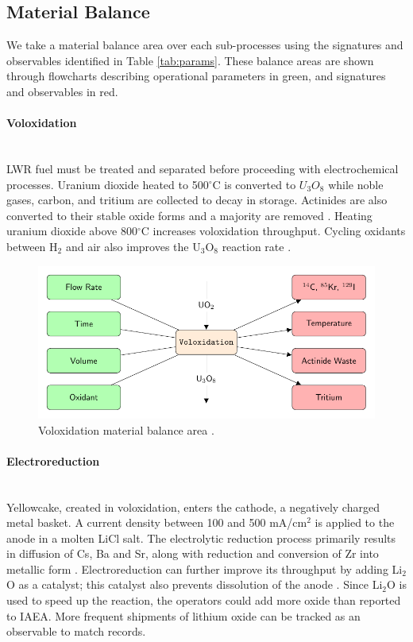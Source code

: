 \subsection{Material Balance}
We take a material balance area over each sub-processes using the signatures and observables identified in Table \ref{tab:params}. 
These balance areas are shown through flowcharts describing operational parameters in green, and signatures and observables in red. 

\paragraph{Voloxidation} \mbox{}\\
\gls{LWR} fuel must be treated and separated before proceeding with electrochemical processes. Uranium dioxide heated to 
500$^{\circ}$C is converted to $U_3O_8$ while noble gases, carbon, and tritium are collected to decay in storage. 
Actinides are also converted to their stable oxide forms and a majority are removed \cite{flowsheet_1998,jubin_spent_2009}. 
Heating uranium dioxide above 800$^{\circ}$C increases voloxidation throughput.
Cycling oxidants between H$_2$ and air also improves the U$_3$O$_8$ reaction rate \cite{jubin_spent_2009}.

\begin{figure}[h]
	\centering
	\includegraphics[width=0.9\linewidth]{images/volox}
	\caption{Voloxidation material balance area \cite{jubin_spent_2009}.}
	\label{fig:volox}
\end{figure}

\paragraph{Electroreduction} \mbox{}\\ 
Yellowcake, created in voloxidation, enters the cathode, a negatively charged metal basket. 
A current density between 100 and 500 mA/cm$^2$ is applied to the anode in a molten LiCl salt. 
The electrolytic reduction process primarily results in diffusion of Cs, Ba and Sr, along with reduction and conversion of Zr into metallic form \cite{choi_electrochemical_2015,flowsheet_1998}.
Electroreduction can further improve its throughput by adding Li$_2$O as a catalyst; this catalyst also prevents dissolution 
of the anode \cite{choi_electrochemical_2015}. Since Li$_2$O is used to speed up the reaction,
the operators could add more oxide than reported to \gls{IAEA}. More frequent shipments 
of lithium oxide can be tracked as an observable to match records.

